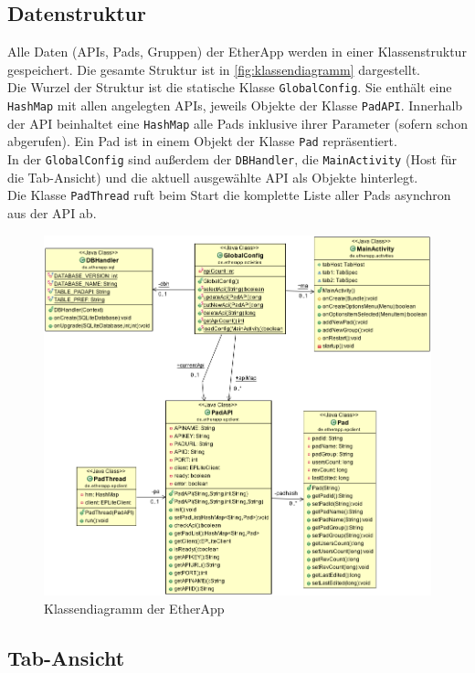 \subsection{Datenstruktur}
Alle Daten (APIs, Pads, Gruppen) der EtherApp werden in einer Klassenstruktur gespeichert. Die gesamte Struktur ist in \autoref{fig:klassendiagramm} dargestellt.\\
Die Wurzel der Struktur ist die statische Klasse \texttt{GlobalConfig}.
Sie enthält eine \texttt{HashMap} mit allen angelegten APIs, jeweils Objekte der Klasse \texttt{PadAPI}.
Innerhalb der API beinhaltet eine \texttt{HashMap} alle Pads inklusive ihrer Parameter (sofern schon abgerufen).
Ein Pad ist in einem Objekt der Klasse \texttt{Pad} repräsentiert.\\
In der \texttt{GlobalConfig} sind außerdem der \texttt{DBHandler}, die \texttt{MainActivity} (Host für die Tab-Ansicht) und die aktuell ausgewählte API als Objekte hinterlegt.\\
Die Klasse \texttt{PadThread} ruft beim Start die komplette Liste aller Pads asynchron aus der API ab.

\begin{figure}[H]
	\centering
	\includegraphics[width=\textwidth]{./inc/etherapp_classes.png}
	\caption{Klassendiagramm der EtherApp}
	\label{fig:klassendiagramm}
\end{figure}


\subsection{Tab-Ansicht}

